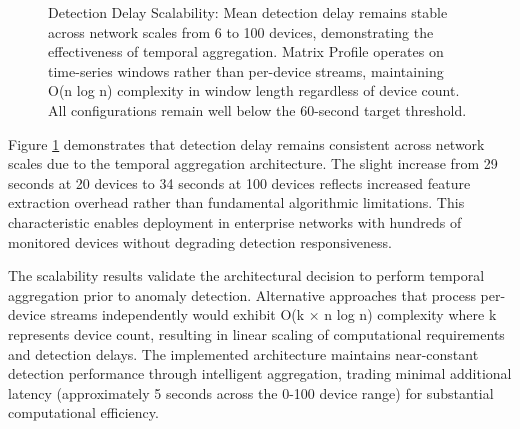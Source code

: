 \documentclass[11pt]{article}
\begin{document}
\begin{figure}[h]
\centering
{}
\caption{Detection Delay Scalability: Mean detection delay remains stable across network scales from 6 to 100 devices, demonstrating the effectiveness of temporal aggregation. Matrix Profile operates on time-series windows rather than per-device streams, maintaining O(n log n) complexity in window length regardless of device count. All configurations remain well below the 60-second target threshold.}
\label{fig:scalability}
\end{figure}

Figure \ref{fig:scalability} demonstrates that detection delay remains consistent across network scales due to the temporal aggregation architecture. The slight increase from 29 seconds at 20 devices to 34 seconds at 100 devices reflects increased feature extraction overhead rather than fundamental algorithmic limitations. This characteristic enables deployment in enterprise networks with hundreds of monitored devices without degrading detection responsiveness.

The scalability results validate the architectural decision to perform temporal aggregation prior to anomaly detection. Alternative approaches that process per-device streams independently would exhibit O(k × n log n) complexity where k represents device count, resulting in linear scaling of computational requirements and detection delays. The implemented architecture maintains near-constant detection performance through intelligent aggregation, trading minimal additional latency (approximately 5 seconds across the 0-100 device range) for substantial computational efficiency.
\end{document}
